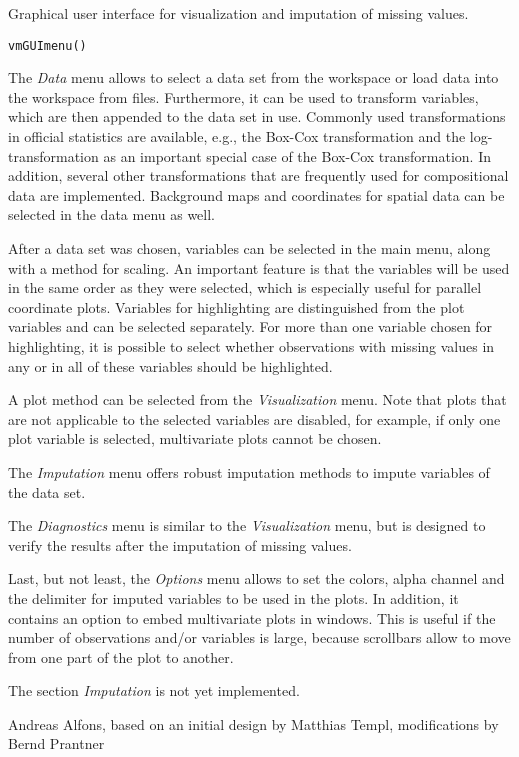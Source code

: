%
\begin{Description}\relax
Graphical user interface for visualization and imputation of 
missing values.
\end{Description}
%
\begin{Usage}
\begin{verbatim}
vmGUImenu()
\end{verbatim}
\end{Usage}
%
\begin{Details}\relax
The \emph{Data} menu allows to select a data set from the \R{} workspace or 
load data into the workspace from  files.  Furthermore, it can 
be used to transform variables, which are then appended to the data set
in use.  Commonly used transformations in official statistics are 
available, e.g., the Box-Cox transformation and the log-transformation 
as an important special case of the Box-Cox transformation.  In addition, 
several other transformations that are frequently used for compositional 
data are implemented. Background maps and coordinates for spatial data 
can be selected in the data menu as well.

After a data set was chosen, variables can be selected in the main menu, 
along with a method for scaling.  An important feature is that the 
variables will be used in the same order as they were selected, which 
is especially useful for parallel coordinate plots.  Variables for 
highlighting are distinguished from the plot variables and can be 
selected separately.  For more than one variable chosen for highlighting, 
it is possible to select whether observations with missing values in any 
or in all of these variables should be highlighted.

A plot method can be selected from the \emph{Visualization} menu. Note that
plots that are not applicable to the selected variables are disabled, for
example, if only one plot variable is selected, multivariate plots cannot 
be chosen.

The \emph{Imputation} menu offers robust imputation methods to impute
variables of the data set.

The \emph{Diagnostics} menu is similar to the \emph{Visualization} menu,
but is designed to verify the results after the imputation of missing 
values. 

Last, but not least, the \emph{Options} menu allows to set the colors, 
alpha channel and the delimiter for imputed variables to be used in the plots.
In addition, it contains an option to embed multivariate plots in
 windows. This is useful if the number of observations and/or
variables is large, because scrollbars allow to move from one part of the
plot to another.

The section \emph{Imputation} is not yet implemented.
\end{Details}
%
\begin{Author}\relax
Andreas Alfons, based on an initial design by Matthias Templ,
modifications by Bernd Prantner
\end{Author}
